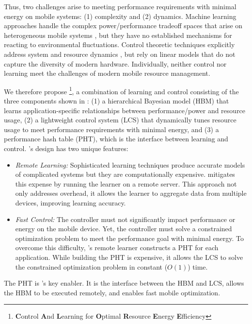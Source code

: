 Thus, two challenges arise to meeting performance requirements with
minimal energy on mobile systems: (1) complexity and (2) dynamics.
Machine learning approaches handle the complex power/performance
tradeoff spaces that arise on heterogeneous mobile systems
\cite{reddiHPCA2013,dubach2010,Bitirgen2008,Ipek,Koala,LEO,Flicker,Ponamarev},
but they have no established mechanisms for reacting to environmental
fluctuations.    Control theoretic techniques explicitly address
system and resource dynamics
\cite{Hellerstein2004a,Chen2011,PTRADE,POET,ControlWare,Agilos,grace2},
but rely on linear models that do not capture the diversity of modern
hardware.   Individually, neither control nor learning
meet the challenges of modern mobile resource management.

We therefore propose \SYSTEM{}\footnote{\textbf{C}ontrol \textbf{A}nd
  \textbf{L}earning for \textbf{O}ptimal \textbf{R}esource
  \textbf{E}nergy \textbf{E}fficiency}, a combination of learning and
control consisting of the three components shown in
: (1) a hierarchical Bayesian model (HBM) that
learns application-specific relationships between performance/power
and resource usage, (2) a lightweight control system (LCS) that
dynamically tunes resource usage to meet performance requirements with
minimal energy, and (3) a performance hash table (PHT), which is the
interface between learning and control.  \SYSTEM{}'s design has two
unique features:
\begin{itemize}
\item \textit{Remote Learning:} Sophisticated learning techniques
  produce accurate models of complicated systems but they are
  computationally expensive.  \SYSTEM{} mitigates this expense by
  running the learner on a remote server. This approach not only
  addresses overhead, it allows the learner to aggregate data from
  multiple devices, improving learning accuracy.
\item \textit{Fast Control:} The controller must not significantly
  impact performance or energy on the mobile device.  Yet, the
  controller must solve a constrained optimization problem to meet the
  performance goal with minimal energy.  To overcome this difficulty,
  \SYSTEM{}'s remote learner constructs a PHT for each application.
  While building the PHT is expensive, it allows the LCS to solve the
  constrained optimization problem in constant ($O(1)$) time.
\end{itemize}
The PHT is \SYSTEM{}'s key enabler.  It is the interface between the
HBM and LCS, allows the HBM to be executed remotely, and enables fast
mobile optimization.


